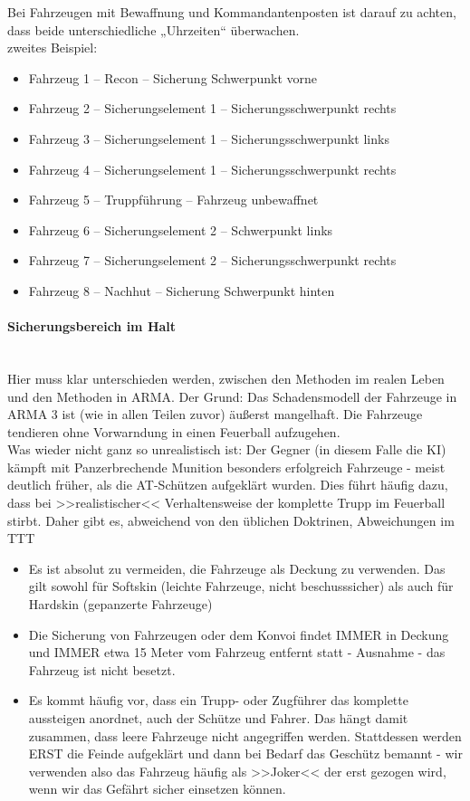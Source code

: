 	Bei Fahrzeugen mit Bewaffnung und Kommandantenposten ist darauf zu achten, dass beide unterschiedliche „Uhrzeiten“ überwachen. \\
	zweites Beispiel:

	\begin{itemize}
		\item Fahrzeug 1 – Recon – Sicherung Schwerpunkt vorne
		\item Fahrzeug 2 – Sicherungselement 1 – Sicherungsschwerpunkt rechts
		\item Fahrzeug 3 – Sicherungselement 1 – Sicherungsschwerpunkt links
		\item Fahrzeug 4 – Sicherungselement 1 – Sicherungsschwerpunkt rechts
		\item Fahrzeug 5 – Truppführung – Fahrzeug unbewaffnet
		\item Fahrzeug 6 – Sicherungselement 2 – Schwerpunkt links
		\item Fahrzeug 7 – Sicherungselement 2 – Sicherungsschwerpunkt rechts
		\item Fahrzeug 8 – Nachhut – Sicherung Schwerpunkt hinten
	\end{itemize}

\paragraph{Sicherungsbereich im Halt} \ \\
	Hier muss klar unterschieden werden, zwischen den Methoden im  realen Leben und den Methoden in ARMA. Der Grund: Das Schadensmodell der Fahrzeuge in ARMA 3 ist (wie in allen Teilen zuvor) äußerst mangelhaft. Die Fahrzeuge tendieren ohne Vorwarndung in einen Feuerball aufzugehen. \\
	Was wieder nicht ganz so unrealistisch ist: Der Gegner (in diesem Falle die KI) kämpft mit Panzerbrechende Munition besonders erfolgreich Fahrzeuge - meist deutlich früher, als die AT-Schützen aufgeklärt wurden. Dies führt häufig dazu, dass bei >>realistischer<< Verhaltensweise der komplette Trupp im Feuerball stirbt. Daher gibt es, abweichend von den üblichen Doktrinen, Abweichungen im TTT 

	\begin{itemize}
		\item Es ist absolut zu vermeiden, die Fahrzeuge als Deckung zu verwenden. Das gilt sowohl für Softskin (leichte Fahrzeuge, nicht beschusssicher) als auch für Hardskin (gepanzerte Fahrzeuge)
		\item Die Sicherung von Fahrzeugen oder dem Konvoi findet IMMER in Deckung und IMMER etwa 15 Meter vom Fahrzeug entfernt statt - Ausnahme - das Fahrzeug ist nicht besetzt.
		\item Es kommt häufig vor, dass ein Trupp- oder Zugführer das komplette aussteigen anordnet, auch der Schütze und Fahrer. Das hängt damit zusammen, dass leere Fahrzeuge nicht angegriffen werden. Stattdessen werden ERST die Feinde aufgeklärt und dann bei Bedarf das Geschütz bemannt - wir verwenden also das Fahrzeug häufig als >>Joker<<  der erst gezogen wird, wenn wir das Gefährt sicher einsetzen können.
	\end{itemize}

